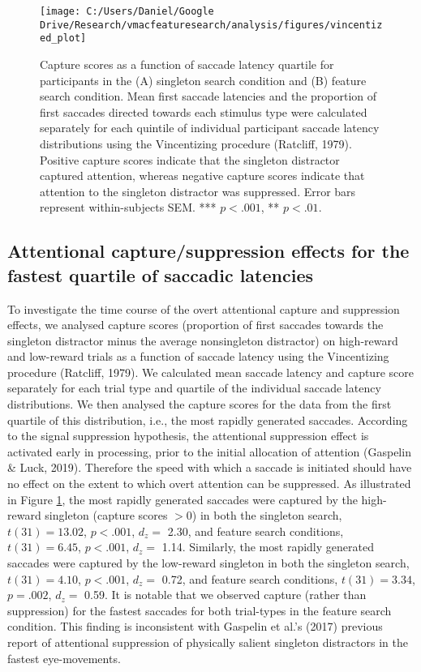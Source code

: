 \documentclass[man, a4paper, noextraspace, 11pt,floatsintext]{apa6}
\theoremstyle{definition}
\theoremstyle{definition}
\theoremstyle{definition}
\theoremstyle{remark}
\begin{document}
\begin{figure}[!h]

{\centering \texttt{[image: C:/Users/Daniel/Google Drive/Research/vmacfeaturesearch/analysis/figures/vincentized\_plot]} 

}

\caption{Capture scores as a function of saccade latency
quartile for participants in the (A) singleton search condition and (B)
feature search condition. Mean first saccade latencies and the
proportion of first saccades directed towards each stimulus type were
calculated separately for each quintile of individual participant
saccade latency distributions using the Vincentizing procedure
(Ratcliff, 1979). Positive capture scores indicate that the singleton
distractor captured attention, whereas negative capture scores indicate
that attention to the singleton distractor was suppressed. Error bars
represent within-subjects SEM. *** \(p<.001\), ** \(p<.01\).}\label{fig:VincentizedPlot}
\end{figure}

\subsection{Attentional capture/suppression effects for the fastest
quartile of saccadic
latencies}\label{attentional-capturesuppression-effects-for-the-fastest-quartile-of-saccadic-latencies}

To investigate the time course of the overt attentional capture and
suppression effects, we analysed capture scores (proportion of first
saccades towards the singleton distractor minus the average nonsingleton
distractor) on high-reward and low-reward trials as a function of
saccade latency using the Vincentizing procedure (Ratcliff, 1979). We
calculated mean saccade latency and capture score separately for each
trial type and quartile of the individual saccade latency distributions.
We then analysed the capture scores for the data from the first quartile
of this distribution, i.e., the most rapidly generated saccades.
According to the signal suppression hypothesis, the attentional
suppression effect is activated early in processing, prior to the
initial allocation of attention (Gaspelin \& Luck, 2019). Therefore the
speed with which a saccade is initiated should have no effect on the
extent to which overt attention can be suppressed. As illustrated in
Figure \ref{fig:VincentizedPlot}, the most rapidly generated saccades
were captured by the high-reward singleton (capture scores \(>0\)) in
both the singleton search, \(t(31) = 13.02\), \(p < .001\), \(d_z=\)
2.30, and feature search conditions, \(t(31) = 6.45\), \(p < .001\),
\(d_z=\) 1.14. Similarly, the most rapidly generated saccades were
captured by the low-reward singleton in both the singleton search,
\(t(31) = 4.10\), \(p < .001\), \(d_z=\) 0.72, and feature search
conditions, \(t(31) = 3.34\), \(p = .002\), \(d_z=\) 0.59. It is notable
that we observed capture (rather than suppression) for the fastest
saccades for both trial-types in the feature search condition. This
finding is inconsistent with Gaspelin et al.'s (2017) previous report of
attentional suppression of physically salient singleton distractors in
the fastest eye-movements.
\end{document}
